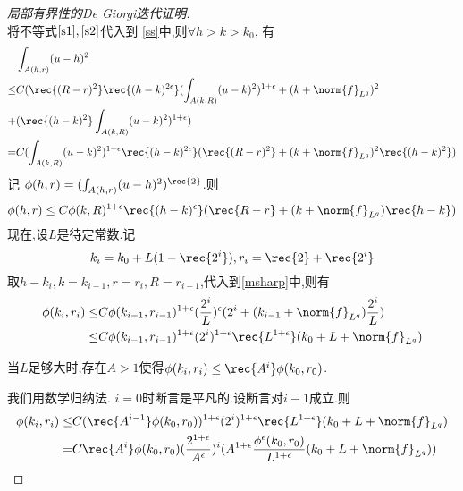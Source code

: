 \begin{proof}[局部有界性的De Giorgi迭代证明]
\begin{equation}
    \end{equation}
    将不等式$\eqref{s1},\eqref{s2}$代入到  \eqref{ss}中,则$\forall h > k > k_0$, 有
    \begin{equation}
        \begin{split}
            &\int_{A(h,r)}(u-h)^2\\
            \le & C(\rec{(R-r)^2}\rec{(h-k)^{2\epsilon}}(\int_{A(k,R)}(u-k)^2)^{1+\epsilon}+(k+\norm{f}_{L^q})^2 \\
            +&(\rec{(h-k)^2}\int_{A(k,R)}(u-k)^2)^{1+\epsilon}) \\
            =& C(\int_{A(k,R)}(u-k)^2)^{1+\epsilon}\rec{(h-k)^{2\epsilon}}(\rec{(R-r)^2}+(k+\norm{f}_{L^q})^2\rec{(h-k)^2})
        \end{split}
    \end{equation}
    记 $\phi(h,r)=(\int_{A(h,r)}(u-h)^2)^\rec{2}$.则
    \begin{equation}\label{msharp}
        \phi(h,r) \le C\phi(k,R)^{1+\epsilon}\rec{(h-k)^\epsilon}(\rec{R-r}+(k+\norm{f}_{L^q})\rec{h-k})
    \end{equation}
    现在,设$L$是待定常数.记
    \begin{equation}
        k_i=k_0+L(1-\rec{2^i}), r_i=\rec{2}+\rec{2^i}
    \end{equation}
    取$h-k_i,k=k_{i-1}, r=r_i,R=r_{i-1}$,代入到\eqref{msharp}中,则有
    \begin{equation}\label{mssharp}
        \begin{split}
            \phi(k_i,r_i) \le & C\phi(k_{i-1},r_{i-1})^{1+\epsilon}(\frac{2^i}{L})^\epsilon(2^i+(k_{i-1}+\norm{f}_{L^q})\frac{2^i}{L}) \\
            \le & C\phi(k_{i-1},r_{i-1})^{1+\epsilon}(2^i)^{1+\epsilon}\rec{L^{1+\epsilon}}(k_0+L+\norm{f}_{L^q})
        \end{split}
    \end{equation}
    \begin{claim*}
        当$L$足够大时,存在$A>1$使得$\phi(k_i,r_i) \le \rec{A^i}\phi(k_0,r_0)$.
    \end{claim*}
    我们用数学归纳法. $i=0$时断言是平凡的.设断言对$i-1$成立.则
    \begin{equation}
        \begin{split}
            \phi(k_i,r_i) \le & C(\rec{A^{i-1}}\phi(k_0,r_0))^{1+\epsilon}(2^i)^{1+\epsilon}\rec{L^{1+\epsilon}}(k_0+L+\norm{f}_{L^q}) \\
            =&C\rec{A^i}\phi(k_0,r_0)(\frac{2^{1+\epsilon}}{A^\epsilon})^i(A^{1+\epsilon}\frac{\phi^\epsilon(k_0,r_0)}{L^{1+\epsilon}}(k_0+L+\norm{f}_{L^q}))

\end{split}
\end{equation}
\end{proof}

